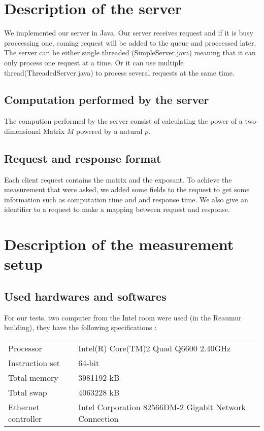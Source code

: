 \section{Description of the server}
\label{sec:Description of the server}

We implemented our server in Java. Our server receives request and if it is busy proccessing one,
coming request will be added to the queue and proccessed later. The server can be either
single threaded (SimpleServer.java) meaning that it can only process one request at a time. Or
it can use multiple thread(ThreadedServer.java) to process several requests at the same time.

\subsection{Computation performed by the server}
\label{sub:Computation performed by the server}
The compution performed by the server consist of calculating the power of a
two-dimensional Matrix $M$ powered by a natural $p$.

\subsection{Request and response format}
\label{sub:Request and response format}

Each client request contains the matrix and the exposant. To achieve the
measurement that were asked, we added some fields to the request to get
some information such as computation time and and response time. We also
give an identifier to a request to make a mapping between request and response.

\section{Description of the measurement setup}
\label{sec:Description of the measurement setup}

\subsection{Used hardwares and softwares}
\label{sub:Used hardwares and softwares}

For our tests, two computer from the Intel room were used (in the Reaumur
building), they have the following specifications :

\begin{tabular}{|l|l|}
    \hline
    Processor & Intel(R) Core(TM)2 Quad Q6600 \@ 2.40GHz \\
    Instruction set & 64-bit \\
    \hline
    Total memory & 3981192 kB \\
    Total swap & 4063228 kB \\
    \hline
    Ethernet controller & Intel Corporation 82566DM-2 Gigabit Network Connection \\
    \hline
\end{tabular}
\bigskip


